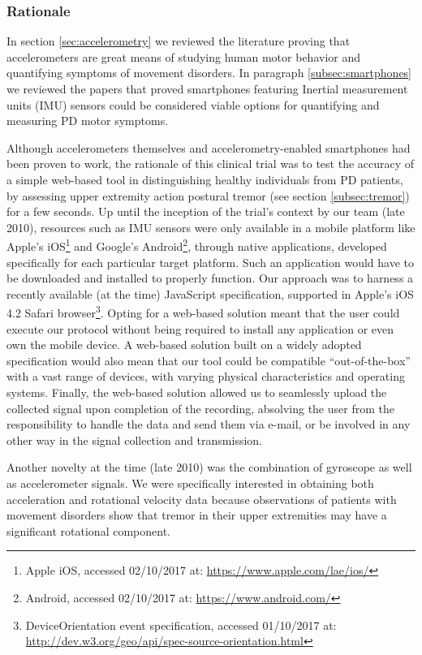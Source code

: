 \subsubsection{Rationale}
\label{subsubsec:smartCT1Rationale}
In section \ref{sec:accelerometry} we reviewed the literature proving that accelerometers are great means of studying human motor behavior and quantifying symptoms of movement disorders. In paragraph \ref{subsec:smartphones} we reviewed the papers that proved smartphones featuring Inertial measurement units (\gls{IMU}) sensors could be considered viable options for quantifying and measuring \gls{PD} motor symptoms.

Although accelerometers themselves and accelerometry-enabled smartphones had been proven to work, the rationale of this clinical trial was to test the accuracy of a simple web-based tool in distinguishing healthy individuals from \gls{PD} patients, by assessing upper extremity action postural tremor (see section \ref{subsec:tremor}) for a few seconds. Up until the inception of the trial's context by our team (late 2010), resources such as \gls{IMU} sensors were only available in a mobile platform like Apple's iOS\footnote{Apple iOS, accessed 02/10/2017 at: \url{https://www.apple.com/lae/ios/}} and Google's Android\footnote{Android, accessed 02/10/2017 at: \url{https://www.android.com/}}, through native applications, developed specifically for each particular target platform. Such an application would have to be downloaded and installed to properly function. Our approach was to harness a recently available (at the time) JavaScript specification, supported in Apple's iOS 4.2 Safari browser\footnote{DeviceOrientation event specification, accessed 01/10/2017 at: \url{http://dev.w3.org/geo/api/spec-source-orientation.html}}. Opting for a web-based solution meant that the user could execute our protocol without being required to install any application or even own the mobile device. A web-based solution built on a widely adopted specification would also mean that our tool could be compatible ``out-of-the-box'' with a vast range of devices, with varying physical characteristics and operating systems. Finally, the web-based solution allowed us to seamlessly upload the collected signal upon completion of the recording, absolving the user from the responsibility to handle the data and send them via e-mail, or be involved in any other way in the signal collection and transmission. 

Another novelty at the time (late 2010) was the combination of gyroscope as well as accelerometer signals. We were specifically interested in obtaining both acceleration and rotational velocity data because observations of patients with movement disorders show that tremor in their upper extremities may have a significant rotational component.

